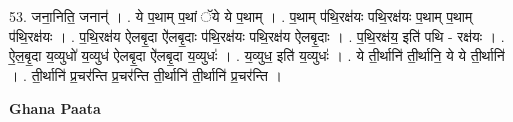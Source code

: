\documentclass[17pt]{extarticle}
\begin{document}
53. जना॒निति॒ जनान्॑ । . ये प॒थाम् प॒थां ॅये ये प॒थाम् । . प॒थाम् प॑थि॒रक्ष॑यः पथि॒रक्ष॑यः प॒थाम् प॒थाम् प॑थि॒रक्ष॑यः । . प॒थि॒रक्ष॑य ऐलबृ॒दा ऐ॑लबृ॒दाः प॑थि॒रक्ष॑यः पथि॒रक्ष॑य ऐलबृ॒दाः । . प॒थि॒रक्ष॑य॒ इति॑ पथि - रक्ष॑यः । . ऐ॒ल॒बृ॒दा य॒व्युधो॑ य॒व्युध॑ ऐलबृ॒दा ऐ॑लबृ॒दा य॒व्युधः॑ । . य॒व्युध॒ इति॑ य॒व्युधः॑ । . ये ती॒र्थानि॑ ती॒र्थानि॒ ये ये ती॒र्थानि॑ । . ती॒र्थानि॑ प्र॒चर॑न्ति प्र॒चर॑न्ति ती॒र्थानि॑ ती॒र्थानि॑ प्र॒चर॑न्ति । \newline

\textbf{Ghana Paata } \newline
\end{document}

